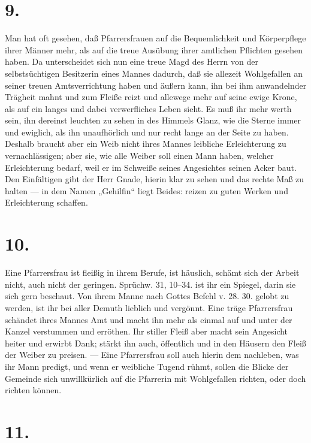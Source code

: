 \section{9.}

Man hat oft gesehen, daß Pfarrersfrauen auf die Bequemlichkeit und Körperpflege ihrer Männer mehr, als auf die treue Ausübung ihrer amtlichen Pflichten gesehen haben. Da unterscheidet sich nun eine treue Magd des Herrn von der selbstsüchtigen Besitzerin eines Mannes dadurch, daß sie allezeit Wohlgefallen an seiner treuen Amtsverrichtung haben und äußern kann, ihn bei ihm anwandelnder Trägheit mahnt und zum Fleiße reizt und allewege mehr auf seine ewige Krone, als auf ein langes und dabei verwerfliches Leben sieht. Es muß ihr mehr werth sein, ihn dereinst leuchten zu sehen in des Himmels Glanz, wie die Sterne immer und ewiglich, als ihn unaufhörlich und nur recht lange an der Seite zu haben. Deshalb braucht aber ein Weib nicht ihres Mannes leibliche Erleichterung zu vernachlässigen; aber sie, wie alle Weiber soll einen Mann haben, welcher Erleichterung bedarf, weil er im Schweiße seines Angesichtes seinen Acker baut. Den Einfältigen gibt der Herr Gnade, hierin klar zu sehen und das rechte Maß zu halten — in dem Namen „Gehilfin“ liegt Beides: reizen zu guten Werken und Erleichterung schaffen.

\section{10.}

Eine Pfarrersfrau ist fleißig in ihrem Berufe, ist häuslich, schämt sich der Arbeit nicht, auch nicht der geringen. Sprüchw. 31, 10–34. ist ihr ein Spiegel, darin sie sich gern beschaut. Von ihrem Manne nach Gottes Befehl v. 28. 30. gelobt zu werden, ist ihr bei aller Demuth lieblich und vergönnt.
Eine träge Pfarrersfrau schändet ihres Mannes Amt und macht ihn mehr als einmal auf und unter der Kanzel verstummen und erröthen. Ihr stiller Fleiß aber macht sein Angesicht heiter und erwirbt Dank; stärkt ihn auch, öffentlich und in den Häusern den Fleiß der Weiber zu preisen. — Eine Pfarrersfrau soll auch hierin dem nachleben, was ihr Mann predigt, und wenn er weibliche Tugend rühmt, sollen die Blicke der Gemeinde sich unwillkürlich auf die Pfarrerin mit Wohlgefallen richten, oder doch richten können.

\section{11.}

